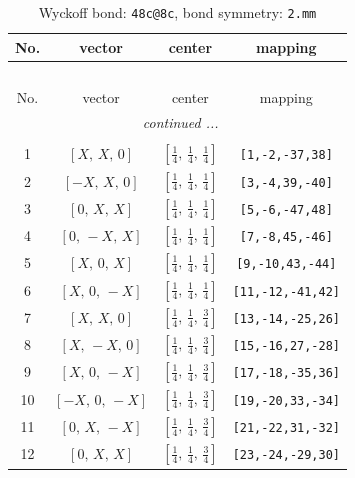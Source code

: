 \documentclass[fleqn,8pt]{jsarticle}
\begin{document}
\begin{longtable}{cccc}
\caption{Wyckoff bond: {\tt 48c@8c}, bond symmetry: {\tt 2.mm}}
 \\
 \hline \hline
No. & vector & center & mapping \\ \hline \endfirsthead

\multicolumn{3}{l}{\tablename\ \thetable{}} \\
 \hline \hline
No. & vector & center & mapping \\ \hline \endhead

 \hline \hline
\multicolumn{3}{r}{\footnotesize\it continued ...} \\ \endfoot

 \hline \hline
\multicolumn{3}{r}{} \\ \endlastfoot

1 & $\left[ X,\, X,\, 0 \right]$ & $\left[ \frac{1}{4},\, \frac{1}{4},\, \frac{1}{4} \right]$ & {\tt [1,-2,-37,38]} \\ \hline
2 & $\left[ - X,\, X,\, 0 \right]$ & $\left[ \frac{1}{4},\, \frac{1}{4},\, \frac{1}{4} \right]$ & {\tt [3,-4,39,-40]} \\ \hline
3 & $\left[ 0,\, X,\, X \right]$ & $\left[ \frac{1}{4},\, \frac{1}{4},\, \frac{1}{4} \right]$ & {\tt [5,-6,-47,48]} \\ \hline
4 & $\left[ 0,\, - X,\, X \right]$ & $\left[ \frac{1}{4},\, \frac{1}{4},\, \frac{1}{4} \right]$ & {\tt [7,-8,45,-46]} \\ \hline
5 & $\left[ X,\, 0,\, X \right]$ & $\left[ \frac{1}{4},\, \frac{1}{4},\, \frac{1}{4} \right]$ & {\tt [9,-10,43,-44]} \\ \hline
6 & $\left[ X,\, 0,\, - X \right]$ & $\left[ \frac{1}{4},\, \frac{1}{4},\, \frac{1}{4} \right]$ & {\tt [11,-12,-41,42]} \\ \hline
7 & $\left[ X,\, X,\, 0 \right]$ & $\left[ \frac{1}{4},\, \frac{1}{4},\, \frac{3}{4} \right]$ & {\tt [13,-14,-25,26]} \\ \hline
8 & $\left[ X,\, - X,\, 0 \right]$ & $\left[ \frac{1}{4},\, \frac{1}{4},\, \frac{3}{4} \right]$ & {\tt [15,-16,27,-28]} \\ \hline
9 & $\left[ X,\, 0,\, - X \right]$ & $\left[ \frac{1}{4},\, \frac{1}{4},\, \frac{3}{4} \right]$ & {\tt [17,-18,-35,36]} \\ \hline
10 & $\left[ - X,\, 0,\, - X \right]$ & $\left[ \frac{1}{4},\, \frac{1}{4},\, \frac{3}{4} \right]$ & {\tt [19,-20,33,-34]} \\ \hline
11 & $\left[ 0,\, X,\, - X \right]$ & $\left[ \frac{1}{4},\, \frac{1}{4},\, \frac{3}{4} \right]$ & {\tt [21,-22,31,-32]} \\ \hline
12 & $\left[ 0,\, X,\, X \right]$ & $\left[ \frac{1}{4},\, \frac{1}{4},\, \frac{3}{4} \right]$ & {\tt [23,-24,-29,30]} \\
\end{longtable}
\end{document}
